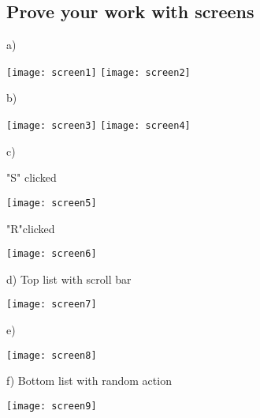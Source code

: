\subsection{Prove your work with screens}

a)

\texttt{[image: screen1]}
\texttt{[image: screen2]}

b)

\texttt{[image: screen3]}
\texttt{[image: screen4]}

c)

"S" clicked

\texttt{[image: screen5]}

"R"clicked 

\texttt{[image: screen6]}

d) Top list with scroll bar

\texttt{[image: screen7]}

e)

\texttt{[image: screen8]}

f) Bottom list with random action

\texttt{[image: screen9]}

\clearpage